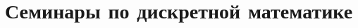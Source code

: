 \documentclass{article}
\begin{document}
\section*{Семинары по дискретной математике}
\thispagestyle{empty}
\setcounter{page}{0}
\tableofcontents
\clearpage

\end{document}
